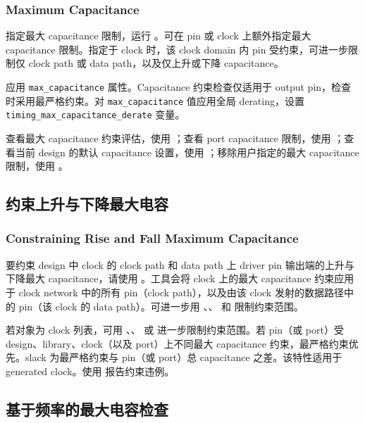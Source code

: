 \subsubsection*{Maximum Capacitance}

指定最大 capacitance 限制，运行 。可在 pin 或 clock 上额外指定最大 capacitance 限制。指定于 clock 时，该 clock domain 内 pin 受约束，可进一步限制仅 clock path 或 data path，以及仅上升或下降 capacitance。

 应用 \texttt{max\_capacitance} 属性。Capacitance 约束检查仅适用于 output pin，检查时采用最严格约束。对 \texttt{max\_capacitance} 值应用全局 derating，设置 \texttt{timing\_max\_capacitance\_derate} 变量。

查看最大 capacitance 约束评估，使用 ；查看 port capacitance 限制，使用 ；查看当前 design 的默认 capacitance 设置，使用 ；移除用户指定的最大 capacitance 限制，使用 。

\subsection{约束上升与下降最大电容}
\subsubsection*{Constraining Rise and Fall Maximum Capacitance}

要约束 design 中 clock 的 clock path 和 data path 上 driver pin 输出端的上升与下降最大 capacitance，请使用 。工具会将 clock 上的最大 capacitance 约束应用于 clock network 中的所有 pin（clock path），以及由该 clock 发射的数据路径中的 pin（该 clock 的 data path）。可进一步用 、、 和  限制约束范围。


若对象为 clock 列表，可用 、、 或  进一步限制约束范围。若 pin（或 port）受 design、library、clock（以及 port）上不同最大 capacitance 约束，最严格约束优先。slack 为最严格约束与 pin（或 port）总 capacitance 之差。该特性适用于 generated clock。使用  报告约束违例。

\subsection{基于频率的最大电容检查}
